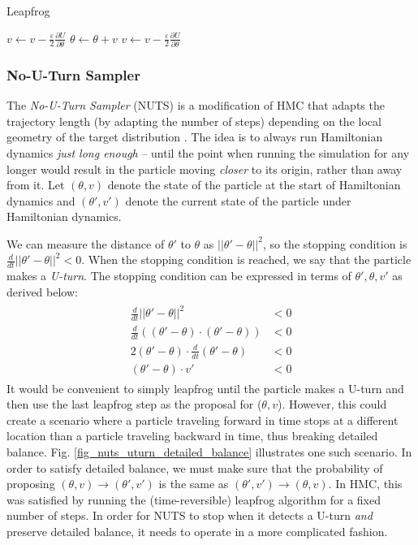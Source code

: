 \documentclass[12pt]{article}
\begin{document}
\begin{algorithm}
\caption{Leapfrog}
\label{alg_leapfrog}
\begin{algorithmic}
 
\State $v \gets v - \frac{\varepsilon}{2} \frac{\partial U}{\partial \theta}$ 
\State $\theta \gets \theta + v$ 
\State $v \gets v - \frac{\varepsilon}{2} \frac{\partial U}{\partial \theta}$ 
\EndFor
\end{algorithmic}
\end{algorithm}

\subsubsection{No-U-Turn Sampler}
\label{sec_nuts}

The \textit{No-U-Turn Sampler} (NUTS) is a modification of HMC that adapts the trajectory length (by adapting the number of steps) depending on the local geometry of the target distribution \cite{nuts}. The idea is to always run Hamiltonian dynamics \textit{just long enough} -- until the point when running the simulation for any longer would result in the particle moving \textit{closer} to its origin, rather than away from it. Let $(\theta, v)$ denote the state of the particle at the start of Hamiltonian dynamics and $(\theta', v')$ denote the current state of the particle under Hamiltonian dynamics.

We can measure the distance of $\theta'$ to $\theta$ as $||\theta'-\theta||^2$, so the stopping condition is $\frac{d}{dt} ||\theta'-\theta||^2 < 0$. When the stopping condition is reached, we say that the particle makes a \textit{U-turn}. The stopping condition can be expressed in terms of $\theta', \theta, v'$ as derived below:
\begin{align}
\begin{split}
\frac{d}{dt} ||\theta'-\theta||^2 &< 0 \\
\frac{d}{dt} \left((\theta'-\theta) \cdot (\theta'-\theta) \right) &< 0 \\
2(\theta'-\theta) \cdot \frac{d}{dt}(\theta'-\theta) &< 0 \\
(\theta'-\theta) \cdot v' &< 0
\end{split}
\label{eq_uturn}
\end{align}
It would be convenient to simply leapfrog until the particle makes a U-turn and then use the last leapfrog step as the proposal for ($\theta, v$). However, this could create a scenario where a particle traveling forward in time stops at a different location than a particle traveling backward in time, thus breaking detailed balance. Fig. \ref{fig_nuts_uturn_detailed_balance} illustrates one such scenario. In order to satisfy detailed balance, we must make sure that the probability of proposing $(\theta, v) \rightarrow (\theta', v')$ is the same as $(\theta', v') \rightarrow (\theta, v)$. In HMC, this was satisfied by running the (time-reversible) leapfrog algorithm for a fixed number of steps. In order for NUTS to stop when it detects a U-turn \textit{and} preserve detailed balance, it needs to operate in a more complicated fashion.
\end{document}
